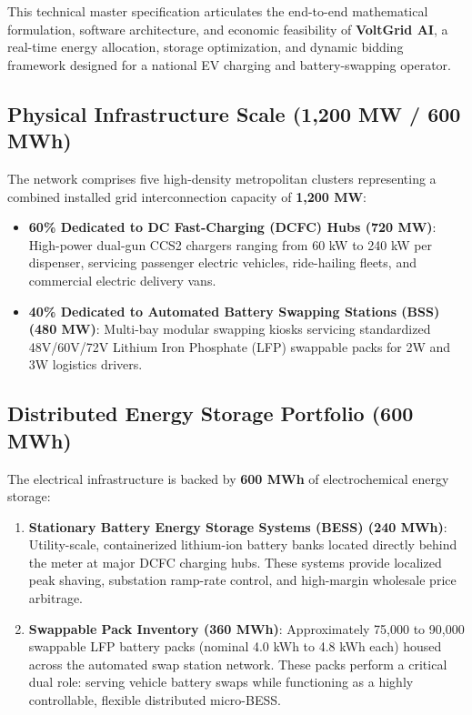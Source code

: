 \documentclass[10.5pt,a4paper]{article}
\begin{document}
This technical master specification articulates the end-to-end mathematical formulation, software architecture, and economic feasibility of \textbf{VoltGrid AI}, a real-time energy allocation, storage optimization, and dynamic bidding framework designed for a national EV charging and battery-swapping operator.

\subsection{Physical Infrastructure Scale (1,200 MW / 600 MWh)}
The network comprises five high-density metropolitan clusters representing a combined installed grid interconnection capacity of \textbf{1,200 MW}:
\begin{itemize}[noitemsep]
    \item \textbf{60\% Dedicated to DC Fast-Charging (DCFC) Hubs (720 MW)}: High-power dual-gun CCS2 chargers ranging from 60 kW to 240 kW per dispenser, servicing passenger electric vehicles, ride-hailing fleets, and commercial electric delivery vans.
    \item \textbf{40\% Dedicated to Automated Battery Swapping Stations (BSS) (480 MW)}: Multi-bay modular swapping kiosks servicing standardized 48V/60V/72V Lithium Iron Phosphate (LFP) swappable packs for 2W and 3W logistics drivers.
\end{itemize}

\subsection{Distributed Energy Storage Portfolio (600 MWh)}
The electrical infrastructure is backed by \textbf{600 MWh} of electrochemical energy storage:
\begin{enumerate}[noitemsep]
    \item \textbf{Stationary Battery Energy Storage Systems (BESS) (240 MWh)}: Utility-scale, containerized lithium-ion battery banks located directly behind the meter at major DCFC charging hubs. These systems provide localized peak shaving, substation ramp-rate control, and high-margin wholesale price arbitrage.
    \item \textbf{Swappable Pack Inventory (360 MWh)}: Approximately 75,000 to 90,000 swappable LFP battery packs (nominal 4.0 kWh to 4.8 kWh each) housed across the automated swap station network. These packs perform a critical dual role: serving vehicle battery swaps while functioning as a highly controllable, flexible distributed micro-BESS.
\end{enumerate}
\end{document}

